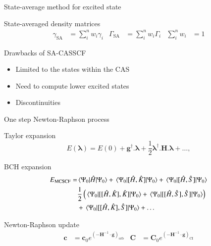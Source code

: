 \documentclass[10pt]{beamer}
\begin{document}
\begin{frame}{State-average method for excited state}
  \pause[1]
  \begin{block}{State-averaged density matrices}
    \begin{align}
      \label{eq:sa_dm}
      \gamma_{\text{SA}} &= \sum_i^n w_i \gamma_i & \Gamma_{\text{SA}} &= \sum_i^n w_i \Gamma_i & \sum_i^n w_i&=1
    \end{align}
  \end{block}
  \pause[2]
  \begin{block}{Drawbacks of SA-CASSCF}
    \begin{itemize}
     \item Limited to the states within the CAS
     \item Need to compute lower excited states
     \item Discontinuities
    \end{itemize}
  \end{block}
\end{frame}

\begin{frame}{One step Newton-Raphson process}
  \pause[1]
  \begin{block}{Taylor expansion}
    \begin{equation}
      \label{eq:MCSCF_NRJ_Taylor}
      E(\bm{\lambda}) = E(0) + \boldsymbol{g}^\dagger.\bm{\lambda} + \frac{1}{2} \bm{\lambda}^\dagger.\boldsymbol{H}.\bm{\lambda} + \dots,
    \end{equation}
  \end{block}
  \pause[2]
  \begin{block}{BCH expansion}
    \begin{equation}
      \label{eq:MCSCF_NRJ_BCH}
      \begin{split}
        E_{\text{MCSCF}} = &\mel{\Psi_0}{\Hat{H}}{\Psi_0} + \mel{\Psi_0}{[\Hat{H},\Hat{K}]}{\Psi_0} + \mel{\Psi_0}{[\Hat{H},\Hat{S}]}{\Psi_0}  \\
        &\frac{1}{2} \left(\mel{\Psi_0}{[[\Hat{H},\Hat{K}],\Hat{K}]}{\Psi_0}+ \mel{\Psi_0}{[[\Hat{H},\Hat{S}],\Hat{S}]}{\Psi_0}\right) \\
        &+ \mel{\Psi_0}{[[\Hat{H},\Hat{K}],\Hat{S}]}{\Psi_0} + \dots
      \end{split}
    \end{equation}
  \end{block}
  \pause[3]
  \begin{block}{Newton-Raphson update}
    \begin{align}
      \bm{c}&= \bm{c}_0 e^{(-\bm{H}^{-1}\cdot \bm{g})_{\text{orb}}} & \bm{C}&= \bm{C}_0 e^{(-\bm{H}^{-1}\cdot \bm{g})_{\text{CI}}}
    \end{align}
  \end{block}
\end{frame}
\end{document}
